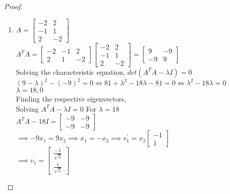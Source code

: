 \documentclass[12pt]{article}
\begin{document}
\begin{proof}
\begin{enumerate}[label=(\alph*)]
\begin{proof}
$$\implies U\Sigma V^T = \sigma_{1}u_1v_1^T + \sigma_{2}u_2v_2^T + ... + \sigma_{r}u_rv_r^T + (0)u_{r+1}v_{r+1}^T + ... + (0)u_nv_n^T $$

$$ \implies A = U\Sigma V^T = \sigma_{1}u_1v_1^T + \sigma_{2}u_2v_2^T + ... + \sigma_{r}u_rv_r^T$$
\end{proof}

\item $ A = \begin{bmatrix}
    -2 & 2 \\
    -1 & 1 \\ 
    2 & -2 
\end{bmatrix} $ \\

$A^TA = \begin{bmatrix}
    -2 & -1 & 2 \\ 
    2 & 1 & -2
\end{bmatrix}\begin{bmatrix}
    -2 & 2 \\
    -1 & 1 \\ 
    2 & -2 
\end{bmatrix} = \begin{bmatrix}
    9 & -9 \\ 
    -9 & 9
\end{bmatrix}$ \\

Solving the characteristic equation, $det(A^TA - \lambda I) = 0$ \\
$(9-\lambda)^2 - (-9)^2 = 0 \iff 81 + \lambda^2 -18\lambda - 81 = 0 \iff \lambda^2 - 18\lambda = 0$ \\
$\lambda = 18,0$ \\
Finding the respective eigenvectors, \\
Solving $A^TA - \lambda I = 0$
For $\lambda = 18$ \\
$A^TA - 18I = \begin{bmatrix}
    -9 & -9 \\ 
    -9 & -9
\end{bmatrix} $\\

$\implies -9x_1 = 9x_2 \implies x_1 = -x_2 \implies v_1^{'} = x_2 \begin{bmatrix}
-1 \\ 1
\end{bmatrix}$ \\
$\implies v_1 = \begin{bmatrix}
\frac{-1}{\sqrt{2}} \\ \frac{1}{\sqrt{2}}
\end{bmatrix} $ \\


\end{enumerate}
\end{proof}
\end{document}
